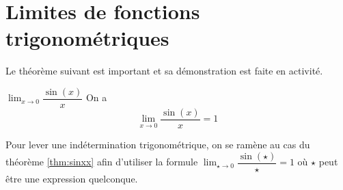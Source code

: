 \documentclass[a4paper,12pt]{article}
\begin{document}
\section{Limites de fonctions trigonométriques}
Le théorème suivant est important et sa démonstration est faite en activité. 
\medskip
\begin{thm}[label=thm:sinxx]
	\smallskip
$\displaystyle\lim_{x \to 0} \dfrac{\sin(x)}{x}$
	\tcblower
On a  \[\displaystyle\lim_{x \to 0} \dfrac{\sin(x)}{x} = 1\]
\end{thm}

\begin{methode}
\tcblower
Pour lever une indétermination trigonométrique, on se ramène au cas du théorème \ref{thm:sinxx} afin d'utiliser la formule $\displaystyle\lim_{\star \to 0} \dfrac{\sin(\star)}{\star} = 1$ où $\star$ peut être une expression quelconque.
\end{methode}
\end{document}
